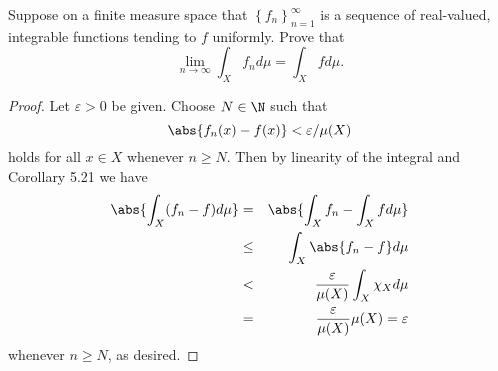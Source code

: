 \documentclass[12pt]{amsart}
\begin{document}
\setcounter{thm}{9}

\begin{thm}
  Suppose on a finite measure space that $\left\{f_n\right\}_{n = 1}^\infty$ is a sequence of real-valued, integrable functions tending to $f$ uniformly.
  Prove that 
  $$\lim_{n \rightarrow \infty} \int_X f_n d\mu = \int_X f d\mu.$$

  \begin{proof}
    Let $\varepsilon > 0$ be given.
    Choose $N \in \N$ such that 
    $$\abs{f_n(x) - f(x)} < \varepsilon/\mu(X)$$
    holds for all $x \in X$ whenever $n \geq N$.
    Then by linearity of the integral and Corollary 5.21 we have
    \begin{eqnarray*}
      \abs{\int_X (f_n - f) d\mu} & = & \abs{\int_X f_n - \int_X f d\mu}\\
      & \leq & \int_X \abs{f_n - f} d\mu\\
      & < & \frac{\varepsilon}{\mu(X)} \int_X \chi_X d\mu\\
      & = & \frac{\varepsilon}{\mu(X)} \mu(X) = \varepsilon
    \end{eqnarray*}
    whenever $n \geq N$, as desired.
  \end{proof}
\end{thm}
\pagebreak

\setcounter{thm}{16}
\end{document}
